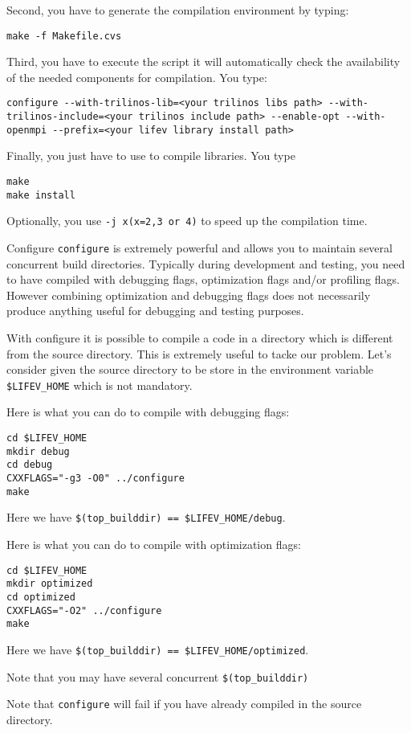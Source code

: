 \noindent Second, you have to generate the compilation environment by typing:
\begin{verbatim}
make -f Makefile.cvs
\end{verbatim}

\noindent Third, you have to execute the script
it will automatically check the availability of the needed components
for \lifev compilation. You type:

\begin{verbatim}
configure --with-trilinos-lib=<your trilinos libs path> --with-trilinos-include=<your trilinos include path> --enable-opt --with-openmpi --prefix=<your lifev library install path>

\end{verbatim}

\noindent Finally, you just have to use  to compile \lifev libraries. You type
\begin{verbatim}
make
make install
\end{verbatim}
Optionally, you use \verb!-j x(x=2,3 or 4)! to speed up the compilation time.

\begin{hint}{Configure}
  \label{hint:configure}
  \verb!configure! is extremely powerful and allows you to maintain
  several concurrent build directories. Typically during development
  and testing, you need to have \lifev compiled with debugging flags,
  optimization flags and/or profiling flags. However combining
  optimization and debugging flags does not necessarily produce
  anything useful for debugging and testing purposes.

  With configure it is possible to compile a code in a directory which
  is different from the source directory. This is extremely useful to
  tacke our problem. Let's consider given the source directory to be
  store in the environment variable \verb!$LIFEV_HOME! which is not
  mandatory.

Here is what you can do to compile with debugging flags:
\begin{verbatim}
cd $LIFEV_HOME
mkdir debug
cd debug
CXXFLAGS="-g3 -O0" ../configure
make
\end{verbatim}
Here we have \verb+$(top_builddir) == $LIFEV_HOME/debug+.

Here is what you can do to compile with optimization flags:
\begin{verbatim}
cd $LIFEV_HOME
mkdir optimized
cd optimized
CXXFLAGS="-O2" ../configure
make
\end{verbatim}
Here we have \verb+$(top_builddir) == $LIFEV_HOME/optimized+.

\noindent Note that you may have several concurrent \verb+$(top_builddir)+

\noindent Note that \verb!configure! will fail if you have already compiled
\lifev in the source directory.


\end{hint}


